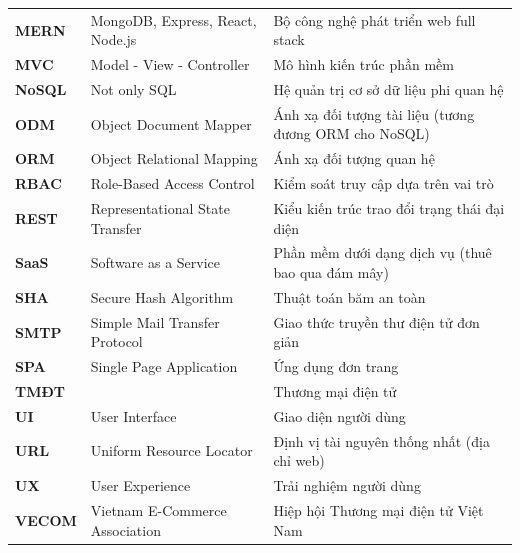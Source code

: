 \documentclass[../DoAn.tex]{subfiles}
\begin{document}
\begin{longtable}{l p{6cm} p{7cm}}
  \textbf{MERN} & MongoDB, Express, React, Node.js & Bộ công nghệ phát triển web full stack\\
  \textbf{MVC} & Model - View - Controller & Mô hình kiến trúc phần mềm\\
  \textbf{NoSQL} & Not only SQL & Hệ quản trị cơ sở dữ liệu phi quan hệ\\
  \textbf{ODM} & Object Document Mapper & Ánh xạ đối tượng tài liệu (tương đương ORM cho NoSQL)\\
  \textbf{ORM} & Object Relational Mapping & Ánh xạ đối tượng quan hệ\\
  \textbf{RBAC} & Role-Based Access Control & Kiểm soát truy cập dựa trên vai trò\\
  \textbf{REST} & Representational State Transfer & Kiểu kiến trúc trao đổi trạng thái đại diện\\
  \textbf{SaaS} & Software as a Service & Phần mềm dưới dạng dịch vụ (thuê bao qua đám mây)\\
  \textbf{SHA} & Secure Hash Algorithm & Thuật toán băm an toàn\\
  \textbf{SMTP} & Simple Mail Transfer Protocol & Giao thức truyền thư điện tử đơn giản\\
  \textbf{SPA} & Single Page Application & Ứng dụng đơn trang\\
  \textbf{TMĐT} & & Thương mại điện tử\\
  \textbf{UI} & User Interface & Giao diện người dùng\\
  \textbf{URL} & Uniform Resource Locator & Định vị tài nguyên thống nhất (địa chỉ web)\\
  \textbf{UX} & User Experience & Trải nghiệm người dùng\\
  \textbf{VECOM} & Vietnam E-Commerce Association & Hiệp hội Thương mại điện tử Việt Nam\\

    \hline
\end{longtable}
\end{document}
